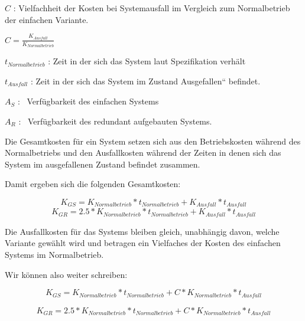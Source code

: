 \documentclass[10pt,a4paper]{article}
\begin{document}
 $C$ : Vielfachheit der Kosten bei Systemausfall im Vergleich zum Normalbetrieb der einfachen Variante.  
 
 $C=\frac{K_{\mathit{Ausfall}}}{K_{\mathit{Normalbetrieb}}}$ 


\bigskip

 $t_{\mathit{Normalbetrieb}}$ : Zeit in der sich das System laut
Spezifikation verh\"alt

 $t_{\mathit{Ausfall}}$ : Zeit in der sich das System im Zustand
{\quotedblbase}Ausgefallen{\textquotedblleft} befindet.


\bigskip

 $A_{S}$ : \ Verf\"ugbarkeit des einfachen Systems

 $A_{R}$ : \ Verf\"ugbarkeit des redundant aufgebauten Systems.


\bigskip

Die Gesamtkosten f\"ur ein System setzen sich aus den Betriebskosten
w\"ahrend des Normalbetriebs und den Ausfallkosten w\"ahrend der Zeiten
in denen sich das System im ausgefallenen Zustand befindet zusammen.


\bigskip

Damit ergeben sich die folgenden Gesamtkosten:


\bigskip

\begin{equation*}
K_{\mathit{GS}}=K_{\mathit{Normalbetrieb}}\ast
t_{\mathit{Normalbetrieb}}+K_{\mathit{Ausfall}}\ast
t_{\mathit{Ausfall}}
\end{equation*}
\begin{equation*}
K_{\mathit{GR}}=2.5\ast K_{\mathit{Normalbetrieb}}\ast
t_{\mathit{Normalbetrieb}}+K_{\mathit{Ausfall}}\ast
t_{\mathit{Ausfall}}
\end{equation*}

\bigskip

Die Ausfallkosten f\"ur das Systems bleiben gleich, unabh\"angig davon,
welche Variante gew\"ahlt wird und betragen ein Vielfaches der Kosten
des einfachen Systems im Normalbetrieb.

Wir k\"onnen also weiter schreiben:


\bigskip

\begin{equation*}
K_{\mathit{GS}}=K_{\mathit{Normalbetrieb}}\ast
t_{\mathit{Normalbetrieb}}+C\ast K_{\mathit{Normalbetrieb}}\ast
t_{\mathit{Ausfall}}
\end{equation*}

\bigskip

\begin{equation*}
K_{\mathit{GR}}=2.5\ast K_{\mathit{Normalbetrieb}}\ast
t_{\mathit{Normalbetrieb}}+C\ast K_{\mathit{Normalbetrieb}}\ast
t_{\mathit{Ausfall}}
\end{equation*}
\end{document}
